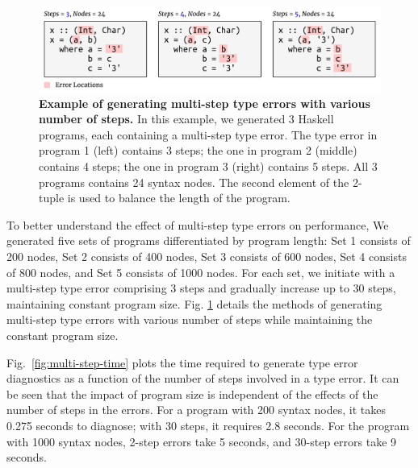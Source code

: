 \documentclass[pdflatex,lineno,sn-nature,Numbered]{sn-jnl}%
\begin{document}
\begin{figure}[ht]
    \centering
    \includegraphics[width=\linewidth]{images/MultiStepMutation}
    \caption{{\bf Example of generating multi-step type errors with various number of steps.} In this example, we generated 3 Haskell programs, each containing a multi-step type error. The type error in program 1 (left) contains 3 steps; the one in program 2 (middle) contains 4 steps; the one in program 3 (right) contains 5 steps. All 3 programs contains 24 syntax nodes. The second element of the 2-tuple is used to balance the length of the program. }
    \label{fig:multi-step-mutation}
\end{figure}

To better understand the effect of multi-step type errors on performance,
We generated five sets of programs differentiated by program length: Set 1 consists of 200 nodes, Set 2 consists of 400 nodes, Set 3 consists of 600 nodes, Set 4 consists of 800 nodes, and Set 5 consists of 1000 nodes. For each set, we initiate with a multi-step type error comprising 3 steps and gradually increase up to 30 steps, maintaining constant program size. Fig. \ref{fig:multi-step-mutation} details the methods of generating multi-step type errors with various number of steps while maintaining the constant program size.

Fig.~\ref{fig:multi-step-time} plots the time required to generate type error diagnostics as a function of the number of steps involved in a type error.  It can be seen that the impact of program size is independent of the effects of the number of steps in the errors. For a program with 200 syntax nodes, it takes 0.275 seconds to diagnose; with 30 steps, it requires 2.8 seconds. For the program with 1000 syntax nodes, 2-step errors take 5 seconds, and 30-step errors take 9 seconds.
\end{document}
